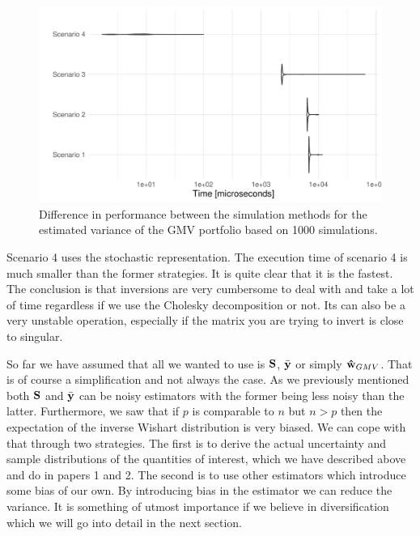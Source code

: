 \documentclass[oneside]{book}\usepackage{knitr}
\begin{document}
\begin{knitrout}\small
{}\color{fgcolor}\begin{figure}

{\centering \includegraphics[width=\maxwidth]{figure/microbenchmark_output-1} 

}

\caption[Difference in performance between the simulation methods for the estimated variance of the GMV portfolio based on 1000 simulations]{Difference in performance between the simulation methods for the estimated variance of the GMV portfolio based on 1000 simulations.}\label{fig:microbenchmark_output}
\end{figure}

\end{knitrout}

Scenario 4 uses the stochastic representation. 
The execution time of scenario 4 is much smaller than the former strategies.
It is quite clear that it is the fastest. 
The conclusion is that inversions are very cumbersome to deal with and take a lot of time regardless if we use the Cholesky decomposition or not.
Its can also be a very unstable operation, especially if the matrix you are trying to invert is close to singular.

So far we have assumed that all we wanted to use is $\mathbf{S}$, $\bar{\mathbf{y}}$ or simply $\mathbf{\hat{w}}_{GMV}$.
That is of course a simplification and not always the case.
As we previously mentioned both $\mathbf{S}$ and $\bar{\mathbf{y}}$ can be noisy estimators with the former being less noisy than the latter. 
Furthermore, we saw that if $p$ is comparable to $n$ but $n>p$ then the expectation of the inverse Wishart distribution is very biased.
We can cope with that through two strategies. 
The first is to derive the actual uncertainty and sample distributions of the quantities of interest, which we have described above and do in papers 1 and 2.
The second is to use other estimators which introduce some bias of our own.
By introducing bias in the estimator we can reduce the variance.
It is something of utmost importance if we believe in diversification which we will go into detail in the next section.
\end{document}
